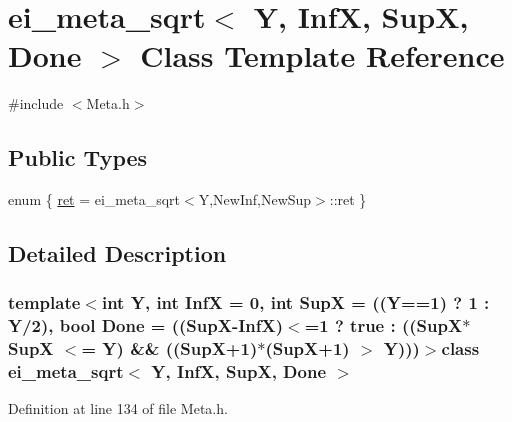 \hypertarget{classei__meta__sqrt}{\section{ei\-\_\-meta\-\_\-sqrt$<$ Y, Inf\-X, Sup\-X, Done $>$ Class Template Reference}
\label{classei__meta__sqrt}
}


{\ttfamily \#include $<$Meta.\-h$>$}

\subsection*{Public Types}
\begin{DoxyCompactItemize}
\item 
enum \{ \hyperlink{classei__meta__sqrt_a7a5bc5c9f6c9cc0da2c70d4e6b5a8735aacdf7a1631664227770a0efdafcdb924}{ret} = ei\-\_\-meta\-\_\-sqrt$<$Y,New\-Inf,New\-Sup$>$\-:\-:ret
 \}
\end{DoxyCompactItemize}


\subsection{Detailed Description}
\subsubsection*{template$<$int Y, int Inf\-X = 0, int Sup\-X = ((\-Y==1) ? 1 \-: Y/2), bool Done = ((\-Sup\-X-\/\-Inf\-X)$<$=1 ? true \-: ((\-Sup\-X$\ast$\-Sup\-X $<$= Y) \&\& ((\-Sup\-X+1)$\ast$(\-Sup\-X+1) $>$ Y)))$>$class ei\-\_\-meta\-\_\-sqrt$<$ Y, Inf\-X, Sup\-X, Done $>$}



Definition at line 134 of file Meta.\-h.



